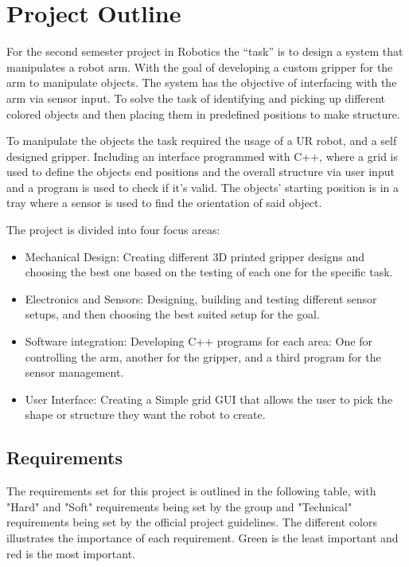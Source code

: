 \section{Project Outline}
For the second semester project in Robotics the “task” is to design a system that manipulates a robot arm. With the goal of developing a custom gripper for the arm to manipulate objects. The system has the objective of interfacing with the arm via sensor input. To solve the task of identifying and picking up different colored objects and then placing them in predefined positions to make structure. 


To manipulate the objects the task required the usage of a UR robot, and a self designed gripper. Including an interface programmed with C++, where a grid is used to define the objects end positions and the overall structure via user input and a program is used to check if it's valid. The objects’ starting position is in a tray where a sensor is used to find the orientation of said object. 


The project is divided into four focus areas:

\begin{itemize}
\item Mechanical Design: 
Creating different 3D printed gripper designs and choosing the best one based on the testing of each one for the specific task. \\

\item Electronics and Sensors:
Designing, building and testing different sensor setups, and then choosing the best suited setup for the goal. \\

\item Software integration: 
Developing C++ programs for each area: One for controlling the arm, another for the gripper, and a third program for the sensor management. \\

\item User Interface: 
Creating a Simple grid GUI that allows the user to pick the shape or structure they want the robot to create. 
\end{itemize}

\subsection*{Requirements}
The requirements set for this project is outlined in the following table, with "Hard" and "Soft" requirements being set by the group and "Technical" requirements being set by the official project guidelines. The different colors illustrates the importance of each requirement. Green is the least important and red is the most important.


